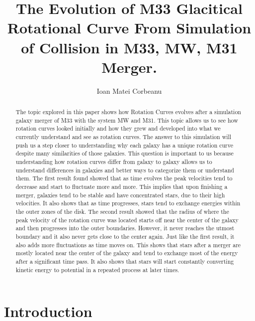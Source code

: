 \documentclass[modern]{aastex61}
\begin{document}
\title{The Evolution of M33 Glacitical Rotational Curve From Simulation of Collision in M33, MW, M31 Merger.}


\author{Ioan Matei Corbeanu}



\begin{abstract}
The topic explored in this paper shows how Rotation Curves evolves after a simulation galaxy merger of M33 with the system MW and M31. This topic allows us to see how rotation curves looked initially and how they grew and developed into what we currently understand and see as rotation curves. The answer to this simulation will push us a step closer to understanding why each galaxy has a unique rotation curve despite many similarities of those galaxies. This question is important to us because understanding how rotation curves differ from galaxy to galaxy allows us to understand differences in galaxies and better ways to categorize them or understand them. The first result found showed that as time evolves the peak velocities tend to decrease and start to fluctuate more and more. This implies that upon finishing a merger, galaxies tend to be stable and have concentrated stars, due to their high velocities. It also shows that as time progresses, stars tend to exchange energies within the outer zones of the disk. The second result showed that the radius of where the peak velocity of the rotation curve was located starts off near the center of the galaxy and then progresses into the outer boundaries. However, it never reaches the utmost boundary and it also never gets close to the center again. Just like the first result, it also adds more fluctuations as time moves on. This shows that stars after a merger are mostly located near the center of the galaxy and tend to exchange most of the energy after a significant time pass. It also shows that stars will start constantly converting kinetic energy to potential in a repeated process at later times.
%
\end{abstract}%








\section{Introduction} \label{sec:intro} 
 
\end{document}
